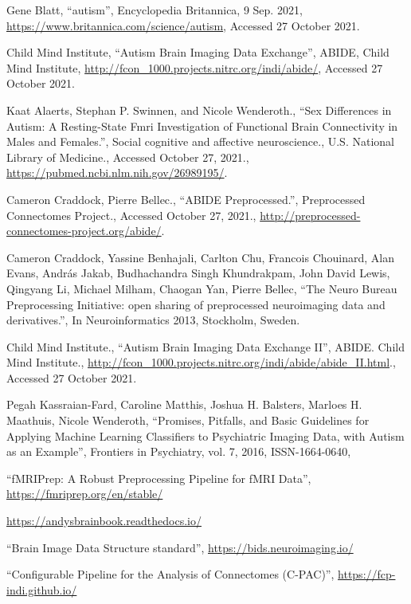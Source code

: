\begin{thebibliography}{9}

Gene Blatt,
``autism'',
Encyclopedia Britannica,
9 Sep. 2021,
\url{https://www.britannica.com/science/autism},
Accessed 27 October 2021.

Child Mind Institute,
``Autism Brain Imaging Data Exchange'',
ABIDE,
Child Mind Institute,
\url{http://fcon_1000.projects.nitrc.org/indi/abide/},
Accessed 27 October 2021.

Kaat Alaerts, Stephan P. Swinnen, and Nicole Wenderoth.,
``Sex Differences in Autism: A Resting-State Fmri Investigation of Functional Brain Connectivity in Males and Females.'',
Social cognitive and affective neuroscience.,
U.S. National Library of Medicine.,
Accessed October 27, 2021.,
\url{https://pubmed.ncbi.nlm.nih.gov/26989195/}.

Cameron Craddock, Pierre Bellec.,
``ABIDE Preprocessed.'',
Preprocessed Connectomes Project.,
Accessed October 27, 2021.,
\url{http://preprocessed-connectomes-project.org/abide/}.

Cameron Craddock, Yassine Benhajali, Carlton Chu, Francois Chouinard, Alan Evans, András Jakab, Budhachandra Singh Khundrakpam, John David Lewis, Qingyang Li, Michael Milham, Chaogan Yan, Pierre Bellec,
``The Neuro Bureau Preprocessing Initiative: open sharing of preprocessed neuroimaging data and derivatives.'',
In Neuroinformatics 2013,
Stockholm, Sweden.

Child Mind Institute.,
``Autism Brain Imaging Data Exchange II'',
ABIDE. Child Mind Institute., \url{http://fcon_1000.projects.nitrc.org/indi/abide/abide_II.html}.,
Accessed 27 October 2021.

Pegah Kassraian-Fard, Caroline Matthis, Joshua H. Balsters, Marloes H. Maathuis, Nicole Wenderoth,
``Promises, Pitfalls, and Basic Guidelines for Applying Machine Learning Classifiers to Psychiatric Imaging Data, with Autism as an Example'',
Frontiers in Psychiatry,
vol. 7,
2016,
ISSN-1664-0640,

``fMRIPrep: A Robust Preprocessing Pipeline for fMRI Data'',
\url{https://fmriprep.org/en/stable/}

\url{https://andysbrainbook.readthedocs.io/}

``Brain Image Data Structure standard'',
\url{https://bids.neuroimaging.io/}

``Configurable Pipeline for the Analysis of Connectomes (C-PAC)'',
\url{https://fcp-indi.github.io/}




\end{thebibliography}